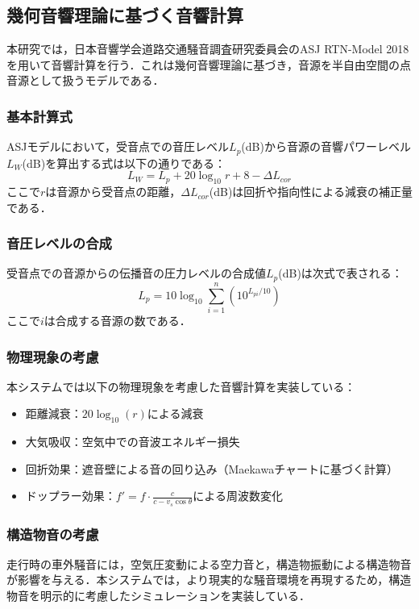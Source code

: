 \documentclass[10pt]{jsarticle}
\begin{document}
\subsection{幾何音響理論に基づく音響計算}
本研究では，日本音響学会道路交通騒音調査研究委員会のASJ RTN-Model 2018を用いて音響計算を行う．これは幾何音響理論に基づき，音源を半自由空間の点音源として扱うモデルである．

\subsubsection{基本計算式}
ASJモデルにおいて，受音点での音圧レベル$L_p$(dB)から音源の音響パワーレベル$L_W$(dB)を算出する式は以下の通りである：
\begin{equation}
L_W = L_p + 20\log_{10}r + 8 - \Delta L_{cor}
\end{equation}
ここで$r$は音源から受音点の距離，$\Delta L_{cor}$(dB)は回折や指向性による減衰の補正量である．

\subsubsection{音圧レベルの合成}
受音点での音源からの伝播音の圧力レベルの合成値$L_p$(dB)は次式で表される：
\begin{equation}
L_p = 10\log_{10}\sum_{i=1}^{n}(10^{L_{pi}/10})
\end{equation}
ここで$i$は合成する音源の数である．

\subsubsection{物理現象の考慮}
本システムでは以下の物理現象を考慮した音響計算を実装している：
\begin{itemize}
\item 距離減衰：$20\log_{10}(r)$による減衰
\item 大気吸収：空気中での音波エネルギー損失
\item 回折効果：遮音壁による音の回り込み（Maekawaチャートに基づく計算）
\item ドップラー効果：$f' = f \cdot \frac{c}{c - v_s \cos\theta}$による周波数変化
\end{itemize}

\subsubsection{構造物音の考慮}
走行時の車外騒音には，空気圧変動による空力音と，構造物振動による構造物音が影響を与える．本システムでは，より現実的な騒音環境を再現するため，構造物音を明示的に考慮したシミュレーションを実装している．
\end{document}
